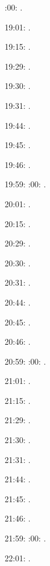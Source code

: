 \documentclass[italian]{article}
\begin{document}
:00:    .

19:01:     . 

19:15:     . 

19:29:     . 

19:30:     .

19:31:     .

19:44:     .

19:45:     .

19:46:     .

19:59:     
:00:    .

20:01:     . 

20:15:     . 

20:29:     . 

20:30:     .

20:31:     .

20:44:     .

20:45:     .

20:46:     .

20:59:     
:00:    .

21:01:     . 

21:15:     . 

21:29:     . 

21:30:     .

21:31:     .

21:44:     .

21:45:     .

21:46:     .

21:59:     
:00:    .

22:01:     . 
\end{document}
